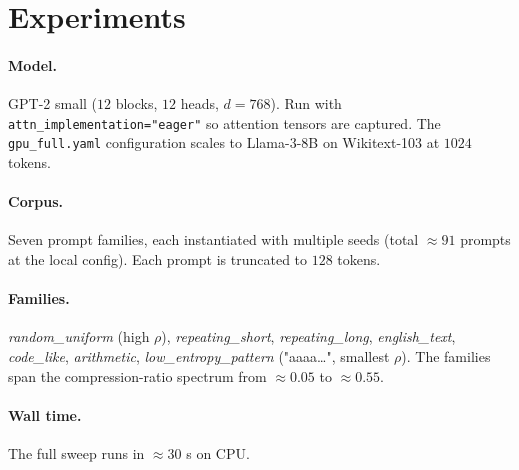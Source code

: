 \section{Experiments}
\paragraph{Model.} GPT-2 small ($12$ blocks, $12$ heads, $d=768$). Run
with \texttt{attn\_implementation="eager"} so attention tensors are
captured. The \texttt{gpu\_full.yaml} configuration scales to
Llama-3-8B on Wikitext-103 at $1024$ tokens.

\paragraph{Corpus.} Seven prompt families, each instantiated with
multiple seeds (total $\approx 91$ prompts at the local config). Each
prompt is truncated to $128$ tokens.

\paragraph{Families.}
\textit{random\_uniform} (high $\rho$), \textit{repeating\_short},
\textit{repeating\_long}, \textit{english\_text}, \textit{code\_like},
\textit{arithmetic}, \textit{low\_entropy\_pattern}
("aaaa\ldots", smallest $\rho$). The families span the
compression-ratio spectrum from $\approx 0.05$ to $\approx 0.55$.

\paragraph{Wall time.} The full sweep runs in $\approx 30$ s on CPU.
